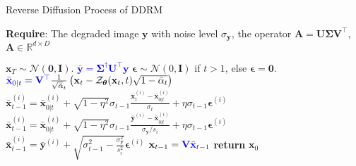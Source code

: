 \documentclass{article} \usepackage{iclr2023_conference,times}
\begin{document}
\newpage


\begin{algorithm}\caption{Reverse Diffusion Process of DDRM}
\label{alg:ddrm}
\textbf{Require}: The degraded image $\mathbf{y}$ with noise level $\sigma_{\mathbf{y}}$, the operator $\mathbf{A}=\mathbf{U}\mathbf{\Sigma}\mathbf{V}^{\top}$, $\mathbf{A}\in \mathbb{R}^{d\times D}$
\begin{algorithmic}[1] \State $\mathbf{x}_{T}\sim\mathcal{N}(\mathbf{0},\mathbf{I})$.
\State \textcolor{blue}{$\bar{\mathbf{y}}=\mathbf{\Sigma}^{\dagger}\mathbf{U}^{\top}\mathbf{y}$}
\State $\boldsymbol{\epsilon}\sim\mathcal{N}(0,\mathbf{I})$ if $t>1$, else $\boldsymbol{\epsilon}=\mathbf{0}$.
\State $\textcolor{blue}{\bar{\mathbf{x}}_{0|t} = \mathbf{V}^{\top}}\frac{1}{\sqrt{\bar{\alpha}}_{t}}	\left( \mathbf{x}_{t} - \mathcal{Z}_{\boldsymbol{\theta}}(\mathbf{x}_{t},t)\sqrt{1-\Bar{\alpha}_{t}} \right)$
\label{alg:ddrm seq0}
\State $\bar{\mathbf{x}}_{t-1}^{(i)} = \bar{\mathbf{x}}_{0|t}^{(i)} + \sqrt{1-\eta^{2}}\sigma_{t-1}\frac{\bar{\mathbf{x}}^{(i)}_{t}-\bar{\mathbf{x}}_{0|t}^{(i)}}{\sigma_{t}} + \eta\sigma_{t-1}\boldsymbol{\epsilon}^{(i)}$
\label{alg:ddrm null}
\State $\bar{\mathbf{x}}_{t-1}^{(i)} = \bar{\mathbf{x}}_{0|t}^{(i)} + \sqrt{1-\eta^{2}}\sigma_{t-1}\frac{\bar{\mathbf{y}}^{(i)}-\bar{\mathbf{x}}_{0|t}^{(i)}}{\sigma_{\mathbf{y}}/s_{i}} + \eta\sigma_{t-1}\boldsymbol{\epsilon}^{(i)}$
\label{alg:ddrm sneq0}
\State $\bar{\mathbf{x}}_{t-1}^{(i)} = \bar{\mathbf{y}}^{(i)} + \sqrt{\sigma_{t-1}^{2}-\frac{\sigma_{\mathbf{y}}^{2}}{s_{i}^{2}}}\boldsymbol{\epsilon}^{(i)}$
\label{alg:ddrm range}
\EndIf
\EndFor
\State $\mathbf{x}_{t-1} = \textcolor{blue}{\mathbf{V}\bar{\mathbf{x}}_{t-1}} $
\EndFor
\State \textbf{return} $\mathbf{x}_0$
\end{algorithmic}
\end{algorithm}
\end{document}
